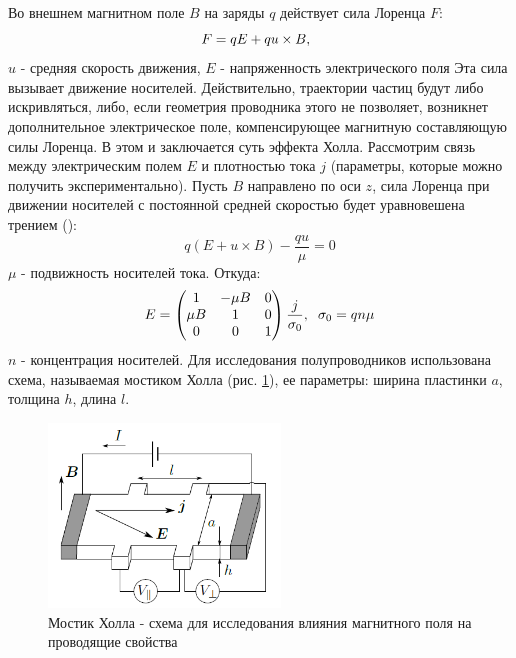 \documentclass[a4paper,12pt]{article} %
\begin{document}
Во внешнем магнитном поле $B$ на заряды $q$ действует сила Лоренца $F$:
\begin{equation}
F = qE+qu\times B,  \hspace{2mm}
\end{equation}
 $u$ - средняя скорость движения, $E$ - напряженность электрического поля
Эта сила вызывает движение носителей. Действительно, траектории частиц будут либо искривляться, либо, если геометрия проводника этого не позволяет,
возникнет дополнительное электрическое поле, компенсирующее магнитную
составляющую силы Лоренца. В этом и заключается суть эффекта Холла. 
Рассмотрим связь между электрическим полем $E$ и плотностью тока $j$ (параметры, которые можно получить экспериментально). Пусть $B$ направлено по оси $z$, сила Лоренца при движении носителей с постоянной средней скоростью будет уравновешена трением (\cite{labnik}):
\begin{equation}
q(E+u\times B)-\frac{qu}{\mu}=0
\end{equation}
$\mu$ - подвижность носителей тока.
Откуда:
\begin{equation}
\label{mu}
E = 
 \begin{pmatrix}
 1 & -\mu B & 0\\
 \mu B & 1 & 0\\
 0 & 0 & 1\\
 \end{pmatrix}
 \frac{j}{\sigma_0}, \hspace{2mm} \sigma_0 = qn\mu
\end{equation}
$n$ - концентрация носителей.
Для исследования полупроводников использована схема, называемая мостиком Холла (рис. \ref{мостик}), ее параметры: ширина пластинки $a$, толщина $h$,
длина $l$.
\begin{figure}[h!]
\begin{center}
\includegraphics[width=0.55\textwidth]{мостик}
\caption{Мостик Холла - схема для исследования влияния магнитного поля на проводящие свойства} \label{мостик}
\end{center}
\end{figure} 
\end{document}
